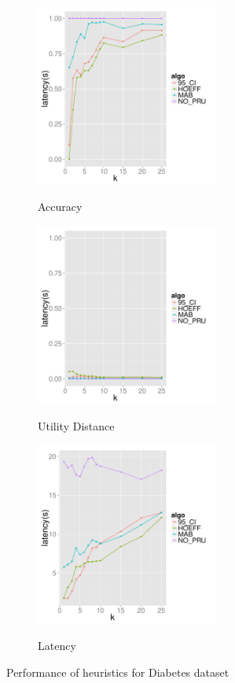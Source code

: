 \begin{figure}[t]
	\centering
	\begin{subfigure}{0.33\linewidth}
		\centering
		{\includegraphics[width=6cm] {Images/dia_in_memory_accuracy.pdf}}
		\caption{Accuracy}
		\label{fig:dia_accuracy}
	\end{subfigure}
	\begin{subfigure}{0.33\linewidth}
		\centering
		{\includegraphics[width=6cm] {Images/dia_in_memory_utility_dist.pdf}}
		\caption{Utility Distance}
		\label{fig:dia_utility_dist}
	\end{subfigure}
	\begin{subfigure}{0.33\linewidth}
		\centering
		{\includegraphics[width=6cm] {Images/dia_in_memory_latency.pdf}}
		\caption{Latency}
		\label{fig:diabetes_latency}
	\end{subfigure}
	\caption{Performance of heuristics for Diabetes dataset}
	\label{fig:diabetes_perf}
\end{figure}

